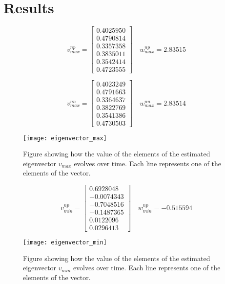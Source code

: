 \section{Results}
\label{sec:results}

\begin{equation*}
v_{max}^{np} = \begin{bmatrix}
	0.4025950 \\
	0.4790814 \\
	0.3357358 \\
    0.3835011 \\
    0.3542414 \\
    0.4723555
\end{bmatrix} \quad w_{max}^{np} =  2.83515
\end{equation*}

\begin{equation*}
v_{max}^{nn} = \begin{bmatrix}
	0.4023249 \\
	0.4791663 \\
	0.3364637 \\
	0.3822769 \\
	0.3541386 \\
	0.4730503
\end{bmatrix} \quad w_{max}^{nn} = 2.83514
\end{equation*}

 \begin{figure}[htbp]
 	\centering
 	\texttt{[image: eigenvector\_max]}
 	\caption{Figure showing how the value of the elements of the estimated eigenvector $v_{max}$ evolves over time. Each line represents one of the elements of the vector.}
 	\label{fig:eigenvector_max}
 \end{figure}
 
 \begin{equation*}
	 v_{min}^{np} = \begin{bmatrix}
	  0.6928048 \\
	 -0.0074343 \\
	 -0.7048516 \\ 
	 -0.1487365 \\
	 0.0122096 \\
	 0.0296413
	 \end{bmatrix} \quad w_{min}^{np} = -0.515594
 \end{equation*}



 \begin{figure}[htbp]
 	\centering
 	\texttt{[image: eigenvector\_min]}
 	\caption{Figure showing how the value of the elements of the estimated eigenvector $v_{min}$ evolves over time. Each line represents one of the elements of the vector.}
 	\label{fig:eigenvector_min}
 \end{figure}

